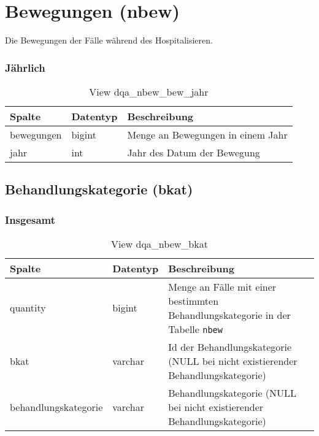 \section{Bewegungen (nbew)} \label{sec:beweg}

Die Bewegungen der Fälle während des Hospitalisieren.

\subsubsection{Jährlich} \label{subsubsec:bewJahr}

\begin{table}[ht]
	\centering   
	\caption{View dqa\_nbew\_bew\_jahr}
	\label{tab:beweJahr}
	\begin{tabular}{||l|l|p{10cm}||}   		
		\hline
		Spalte & Datentyp & Beschreibung \\ [0.5ex]
		\hline\hline
		bewegungen & bigint & Menge an Bewegungen in einem Jahr\\
		\hline
		jahr & int &  Jahr des Datum der Bewegung \\
		\hline
		
	\end{tabular}
\end{table}

\subsection{Behandlungskategorie (bkat)} \label{subsec:behKat}

\subsubsection{Insgesamt} \label{subsubsec:behKatI}

\begin{table}[ht]
	\centering   
	\caption{View dqa\_nbew\_bkat}
	\label{tab:beweBkatAll}
	\begin{tabular}{||l|l|p{10cm}||}   		
		\hline
		Spalte & Datentyp & Beschreibung \\ [0.5ex]
		\hline\hline
		quantity & bigint & Menge an Fälle mit einer bestimmten Behandlungskategorie in der Tabelle \texttt{nbew} \\
		\hline
		bkat & varchar & Id der Behandlungskategorie (NULL bei nicht existierender Behandlungskategorie)\\
		\hline
		behandlungskategorie & varchar & Behandlungskategorie (NULL bei nicht existierender Behandlungskategorie)\\
		\hline
		
	\end{tabular}
\end{table}
\newpage
